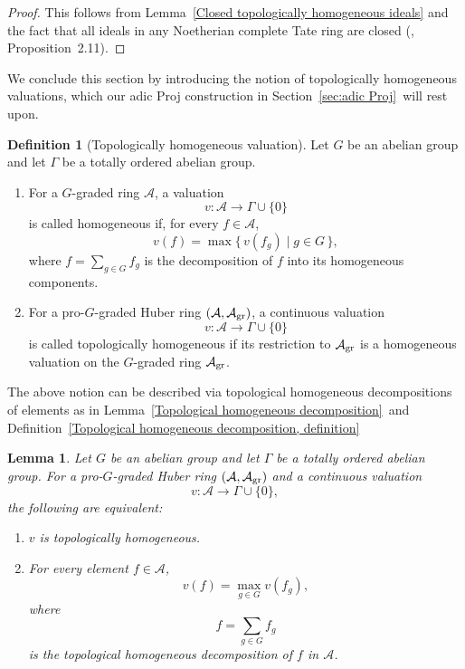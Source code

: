 \documentclass[12pt,twoside,a4paper]{article}
\newtheorem{lemma}[thm]{Lemma}
\theoremstyle{definition}
\newtheorem{mydef}[thm]{Definition}
\theoremstyle{remark}
\newcommand\gr{{\rm gr}}
\begin{document}
\begin{proof}This follows from Lemma~\ref{Closed topologically homogeneous ideals} and the fact that all ideals in any Noetherian complete Tate ring are closed (\cite{Henkel}, Proposition~2.11).\end{proof}
We conclude this section by introducing the notion of topologically homogeneous valuations, which our adic Proj construction in Section~\ref{sec:adic Proj} will rest upon. 
\begin{mydef}[Topologically homogeneous valuation]\label{Topologically homogeneous valuations}Let $G$ be an abelian group and let $\Gamma$ be a totally ordered abelian group. \begin{enumerate}[(1)] \item For a $G$-graded ring $\mathcal{A}$, a valuation \begin{equation*}v: \mathcal{A}\to \Gamma\cup\{0\}\end{equation*}is called homogeneous if, for every $f\in \mathcal{A}$, \begin{equation*}v(f)=\max\{\, v(f_{g})\mid g\in G\,\},\end{equation*}where $f=\sum_{g\in G}f_{g}$ is the decomposition of $f$ into its homogeneous components.\item For a pro-$G$-graded Huber ring $(\mathcal{A}, \mathcal{A}_{\gr})$, a continuous valuation \begin{equation*}v: \mathcal{A}\to \Gamma\cup\{0\}\end{equation*}is called topologically homogeneous if its restriction to $\mathcal{A}_{\gr}$ is a homogeneous valuation on the $G$-graded ring $\mathcal{A}_{\gr}$.\end{enumerate}\end{mydef}
The above notion can be described via topological homogeneous decompositions of elements as in Lemma~\ref{Topological homogeneous decomposition} and Definition~\ref{Topological homogeneous decomposition, definition}
\begin{lemma}\label{Topologically homogeneous valuations and topological homogeneous decompositions}Let $G$ be an abelian group and let $\Gamma$ be a totally ordered abelian group. For a pro-$G$-graded Huber ring $(\mathcal{A}, \mathcal{A}_{\gr})$ and a continuous valuation \begin{equation*}v: \mathcal{A}\to \Gamma\cup\{0\},\end{equation*}the following are equivalent: \begin{enumerate}[(1)]\item $v$ is topologically homogeneous. \item For every element $f\in \mathcal{A}$, \begin{equation*}v(f)=\max_{g\in G}v(f_{g}),\end{equation*}where \begin{equation*}f=\sum_{g\in G}f_{g}\end{equation*}is the topological homogeneous decomposition of $f$ in $\mathcal{A}$.\end{enumerate}\end{lemma}
\end{document}
